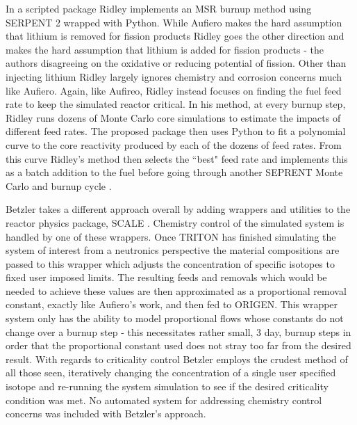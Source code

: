 In a scripted package Ridley implements an MSR burnup method using SERPENT 2
wrapped with Python. While Aufiero makes the hard assumption that lithium is
removed for fission products Ridley goes the other direction and makes the
hard assumption that lithium is added for fission products - the authors
disagreeing on the oxidative or reducing potential of fission. Other than
injecting lithium Ridley largely ignores chemistry and corrosion concerns much
like Aufiero. Again, like Aufireo, Ridley instead focuses on finding the fuel
feed rate to keep the simulated reactor critical. In his method, at every
burnup step, Ridley runs dozens of Monte Carlo core simulations to estimate
the impacts of different feed rates. The proposed package then uses Python to
fit a polynomial curve to the core reactivity produced by each of the dozens
of feed rates. From this curve Ridley's method then selects the ``best" feed
rate and implements this as a batch addition to the fuel before going through
another SEPRENT Monte Carlo and burnup cycle \cite{Ridley}. 

Betzler takes a different approach overall by adding wrappers and utilities
to the reactor physics package, SCALE \cite{Betzler}. 
Chemistry control of the simulated
system is handled by one of these wrappers. Once TRITON has finished simulating
the system of interest from a neutronics perspective the material compositions
are passed to this wrapper which adjusts the concentration of specific isotopes
to fixed user imposed limits. The resulting feeds and removals which would be
needed to achieve these values are then approximated as a proportional removal
constant, exactly like Aufiero's work, and then fed to ORIGEN. This wrapper
system only has the ability to model proportional flows whose constants do not
change over a burnup step - this necessitates rather small, 3 day, burnup steps
in order that the proportional constant used does not stray too far from the
desired result. With regards to criticality control Betzler employs the crudest
method of all those seen, iteratively changing the concentration of a single
user specified isotope and re-running the system simulation to see if the
desired criticality condition was met. No automated system for addressing
chemistry control concerns was included with Betzler's approach. 

